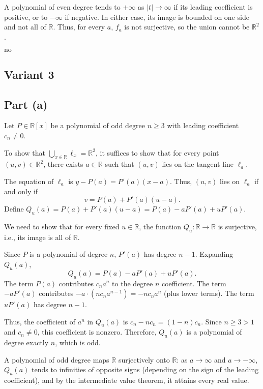 \documentclass[12pt,a4paper]{article}
\theoremstyle{definition}
\begin{document}
    A polynomial of even degree tends to $+\infty$ as $|t| \to \infty$ if its leading coefficient is positive, or to $-\infty$ if negative. In either case, its image is bounded on one side and not all of $\mathbb{R}$. Thus, for every $a$, $f_a$ is not surjective, so the union cannot be $\mathbb{R}^2$.

    $\boxed{\text{no}}$

\subsection{Variant 3}
    \subsection*{Part (a)}

    Let $P \in \mathbb{R}[x]$ be a polynomial of odd degree $n \geq 3$ with leading coefficient $c_n \neq 0$.

    To show that $\bigcup_{x \in \mathbb{R}} \ell_x = \mathbb{R}^2$, it suffices to show that for every point $(u, v) \in \mathbb{R}^2$, there exists $a \in \mathbb{R}$ such that $(u, v)$ lies on the tangent line $\ell_a$.

    The equation of $\ell_a$ is $y - P(a) = P'(a)(x - a)$. Thus, $(u, v)$ lies on $\ell_a$ if and only if
    \[
        v = P(a) + P'(a)(u - a).
    \]
    Define $Q_u(a) = P(a) + P'(a)(u - a) = P(a) - a P'(a) + u P'(a)$.

    We need to show that for every fixed $u \in \mathbb{R}$, the function $Q_u: \mathbb{R} \to \mathbb{R}$ is surjective, i.e., its image is all of $\mathbb{R}$.

    Since $P$ is a polynomial of degree $n$, $P'(a)$ has degree $n-1$. Expanding $Q_u(a)$,
    \[
        Q_u(a) = P(a) - a P'(a) + u P'(a).
    \]
    The term $P(a)$ contributes $c_n a^n$ to the degree $n$ coefficient. The term $-a P'(a)$ contributes $-a \cdot (n c_n a^{n-1}) = -n c_n a^n$ (plus lower terms). The term $u P'(a)$ has degree $n-1$.

    Thus, the coefficient of $a^n$ in $Q_u(a)$ is $c_n - n c_n = (1 - n) c_n$. Since $n \geq 3 > 1$ and $c_n \neq 0$, this coefficient is nonzero. Therefore, $Q_u(a)$ is a polynomial of degree exactly $n$, which is odd.

    A polynomial of odd degree maps $\mathbb{R}$ surjectively onto $\mathbb{R}$: as $a \to \infty$ and $a \to -\infty$, $Q_u(a)$ tends to infinities of opposite signs (depending on the sign of the leading coefficient), and by the intermediate value theorem, it attains every real value.
\end{document}
